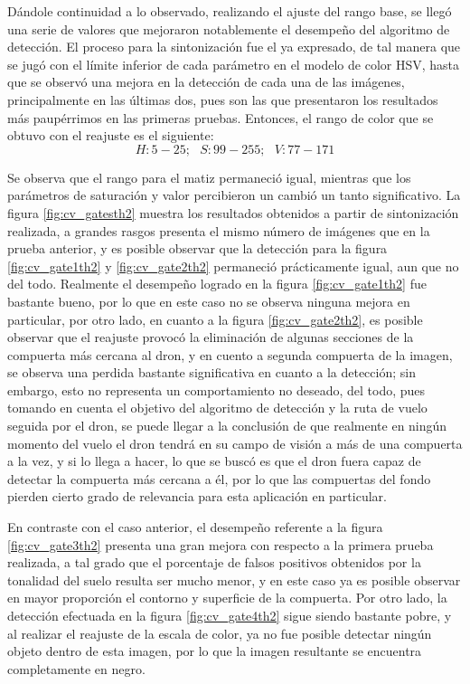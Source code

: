 Dándole continuidad a lo observado, realizando el ajuste del rango base, se llegó una serie de valores que mejoraron notablemente el desempeño del algoritmo de detección. El proceso para la sintonización fue el ya expresado, de tal manera que se jugó con el límite inferior de cada parámetro en el modelo de color HSV, hasta que se observó una mejora en la detección de cada una de las imágenes, principalmente en las últimas dos, pues son las que presentaron los resultados más paupérrimos en las primeras pruebas. Entonces, el rango de color que se obtuvo con el reajuste es el siguiente: \[H:5-25;\text{ } S:99-255;\text{ } V:77-171\]

Se observa que el rango para el matiz permaneció igual, mientras que los parámetros de saturación y valor percibieron un cambió un tanto significativo. La figura \ref{fig:cv_gatesth2} muestra los resultados obtenidos a partir de sintonización realizada, a grandes rasgos presenta el mismo número de imágenes que en la prueba anterior, y es posible observar que la detección para la figura \ref{fig:cv_gate1th2} y \ref{fig:cv_gate2th2} permaneció prácticamente igual, aun que no del todo. Realmente el desempeño logrado en la figura \ref{fig:cv_gate1th2} fue bastante bueno, por lo que en este caso no se observa ninguna mejora en particular, por otro lado, en cuanto a la figura \ref{fig:cv_gate2th2}, es posible observar que el reajuste provocó la eliminación de algunas secciones de la compuerta más cercana al dron, y en cuento a segunda compuerta de la imagen, se observa una perdida bastante significativa en cuanto a la detección; sin embargo, esto no representa un comportamiento no deseado, del todo, pues tomando en cuenta el objetivo del algoritmo de detección y la ruta de vuelo seguida por el dron, se puede llegar a la conclusión de que realmente en ningún momento del vuelo el dron tendrá en su campo de visión a más de una compuerta a la vez, y si lo llega a hacer, lo que se buscó es que el dron fuera capaz de detectar la compuerta más cercana a él, por lo que las compuertas del fondo pierden cierto grado de relevancia para esta aplicación en particular. 

En contraste con el caso anterior, el desempeño referente a la figura \ref{fig:cv_gate3th2} presenta una gran mejora con respecto a la primera prueba realizada, a tal grado que el porcentaje de falsos positivos obtenidos por la tonalidad del suelo resulta ser mucho menor, y en este caso ya es posible observar en mayor proporción el contorno y superficie de la compuerta. Por otro lado, la detección efectuada en la figura \ref{fig:cv_gate4th2} sigue siendo bastante pobre, y al realizar el reajuste de la escala de color, ya no fue posible detectar ningún objeto dentro de esta imagen, por lo que la imagen resultante se encuentra completamente en negro.


